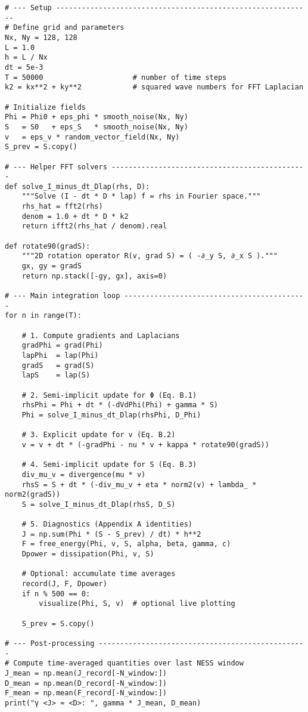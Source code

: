 \documentclass[12pt,a4paper]{article}
\begin{document}
\begin{verbatim}
# --- Setup ------------------------------------------------------------
# Define grid and parameters
Nx, Ny = 128, 128
L = 1.0
h = L / Nx
dt = 5e-3
T = 50000                     # number of time steps
k2 = kx**2 + ky**2            # squared wave numbers for FFT Laplacian

# Initialize fields
Phi = Phi0 + eps_phi * smooth_noise(Nx, Ny)
S   = S0   + eps_S   * smooth_noise(Nx, Ny)
v   = eps_v * random_vector_field(Nx, Ny)
S_prev = S.copy()

# --- Helper FFT solvers ----------------------------------------------
def solve_I_minus_dt_Dlap(rhs, D):
    """Solve (I - dt * D * lap) f = rhs in Fourier space."""
    rhs_hat = fft2(rhs)
    denom = 1.0 + dt * D * k2
    return ifft2(rhs_hat / denom).real

def rotate90(gradS):
    """2D rotation operator R(v, grad S) = ( -∂_y S, ∂_x S )."""
    gx, gy = gradS
    return np.stack([-gy, gx], axis=0)

# --- Main integration loop -------------------------------------------
for n in range(T):

    # 1. Compute gradients and Laplacians
    gradPhi = grad(Phi)
    lapPhi  = lap(Phi)
    gradS   = grad(S)
    lapS    = lap(S)

    # 2. Semi-implicit update for Φ (Eq. B.1)
    rhsPhi = Phi + dt * (-dVdPhi(Phi) + gamma * S)
    Phi = solve_I_minus_dt_Dlap(rhsPhi, D_Phi)

    # 3. Explicit update for v (Eq. B.2)
    v = v + dt * (-gradPhi - nu * v + kappa * rotate90(gradS))

    # 4. Semi-implicit update for S (Eq. B.3)
    div_mu_v = divergence(mu * v)
    rhsS = S + dt * (-div_mu_v + eta * norm2(v) + lambda_ * norm2(gradS))
    S = solve_I_minus_dt_Dlap(rhsS, D_S)

    # 5. Diagnostics (Appendix A identities)
    J = np.sum(Phi * (S - S_prev) / dt) * h**2
    F = free_energy(Phi, v, S, alpha, beta, gamma, c)
    Dpower = dissipation(Phi, v, S)

    # Optional: accumulate time averages
    record(J, F, Dpower)
    if n % 500 == 0:
        visualize(Phi, S, v)  # optional live plotting

    S_prev = S.copy()

# --- Post-processing -------------------------------------------------
# Compute time-averaged quantities over last NESS window
J_mean = np.mean(J_record[-N_window:])
D_mean = np.mean(D_record[-N_window:])
F_mean = np.mean(F_record[-N_window:])
print("γ <J> ≈ <D>: ", gamma * J_mean, D_mean)
\end{verbatim}
\end{document}
